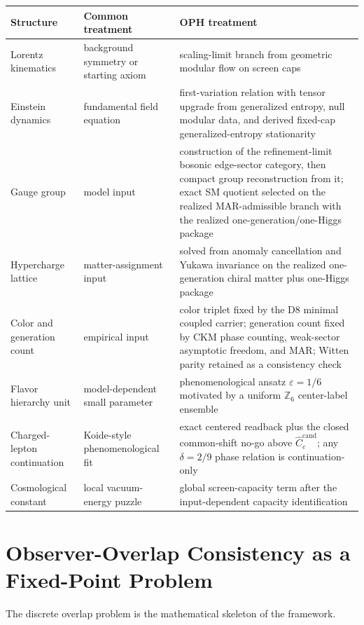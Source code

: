 \documentclass[11pt]{article}
\begin{document}
\begingroup
\footnotesize
\begin{tabular}{@{}>{\raggedright\arraybackslash}p{}>{\raggedright\arraybackslash}p{}>{\raggedright\arraybackslash}p{}@{}}
\toprule
Structure & Common treatment & OPH treatment \\
\midrule
Lorentz kinematics & background symmetry or starting axiom & scaling-limit branch from geometric modular flow on screen caps \\
Einstein dynamics & fundamental field equation & first-variation relation with tensor upgrade from generalized entropy, null modular data, and derived fixed-cap generalized-entropy stationarity \\
Gauge group & model input & construction of the refinement-limit bosonic edge-sector category, then compact group reconstruction from it; exact SM quotient selected on the realized MAR-admissible branch with the realized one-generation/one-Higgs package \\
Hypercharge lattice & matter-assignment input & solved from anomaly cancellation and Yukawa invariance on the realized one-generation chiral matter plus one-Higgs package \\
Color and generation count & empirical input & color triplet fixed by the D8 minimal coupled carrier; generation count fixed by CKM phase counting, weak-sector asymptotic freedom, and MAR; Witten parity retained as a consistency check \\
Flavor hierarchy unit & model-dependent small parameter & phenomenological ansatz \(\varepsilon=1/6\) motivated by a uniform \(\mathbb Z_6\) center-label ensemble \\
Charged-lepton continuation & Koide-style phenomenological fit & exact centered readback plus the closed common-shift no-go above \(\widehat C_e^{\mathrm{cand}}\); any \(\delta=2/9\) phase relation is continuation-only \\
Cosmological constant & local vacuum-energy puzzle & global screen-capacity term after the input-dependent capacity identification \\
\bottomrule
\end{tabular}
\endgroup
\section{Observer-Overlap Consistency as a Fixed-Point Problem}

The discrete overlap problem is the mathematical skeleton of the framework.
\end{document}
